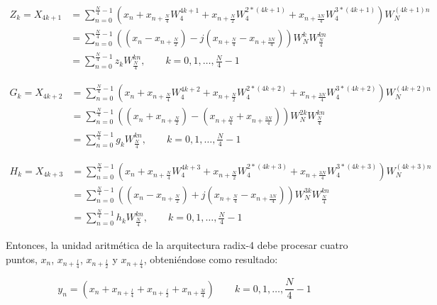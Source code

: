 \begin{equation}
\begin{split}
Z_k = X_{4k+1} &= \sum\limits_{n=0}^{\frac{N}{4}-1}(x_n + x_{n+\frac{N}{4}} W_4^{4k+1} +
x_{n+\frac{N}{2}} W_4^{2*(4k+1)} + x_{n+\frac{3N}{4}} W_4^{3*(4k+1)}) W_N^{(4k+1)n} \\
&= \sum\limits_{n=0}^{\frac{N}{4}-1}((x_n - x_{n+\frac{N}{2}}) -j (x_{n+\frac{N}{4}}
-x_{n+\frac{3N}{4}})) W_N^{k} W_{\frac{N}{4}}^{kn} \\
&= \sum\limits_{n=0}^{\frac{N}{4}-1} z_k W_{\frac{N}{4}}^{kn}, \qquad k = 0,1,\ldots,\frac{N}{4}-1
\end{split}
\label{eq:radix4_Z}
\end{equation}

\begin{equation}
\begin{split}
G_k = X_{4k+2} &= \sum\limits_{n=0}^{\frac{N}{4}-1}(x_n + x_{n+\frac{N}{4}} W_4^{4k+2} +
x_{n+\frac{N}{2}} W_4^{2*(4k+2)} + x_{n+\frac{3N}{4}} W_4^{3*(4k+2)}) W_N^{(4k+2)n} \\
&= \sum\limits_{n=0}^{\frac{N}{4}-1}((x_n + x_{n+\frac{N}{2}}) - (x_{n+\frac{N}{4}}
+ x_{n+\frac{3N}{4}})) W_N^{2k} W_{\frac{N}{4}}^{kn} \\
&= \sum\limits_{n=0}^{\frac{N}{4}-1} g_k W_{\frac{N}{4}}^{kn}, \qquad k = 0,1,\ldots,\frac{N}{4}-1
\end{split}
\label{eq:radix4_G}
\end{equation}

\begin{equation}
\begin{split}
H_k = X_{4k+3} &= \sum\limits_{n=0}^{\frac{N}{4}-1}(x_n + x_{n+\frac{N}{4}} W_4^{4k+3} +
x_{n+\frac{N}{2}} W_4^{2*(4k+3)} + x_{n+\frac{3N}{4}} W_4^{3*(4k+3)}) W_N^{(4k+3)n} \\
&= \sum\limits_{n=0}^{\frac{N}{4}-1}((x_n - x_{n+\frac{N}{2}}) +j (x_{n+\frac{N}{4}}
- x_{n+\frac{3N}{4}})) W_N^{3k} W_{\frac{N}{4}}^{kn} \\
&= \sum\limits_{n=0}^{\frac{N}{4}-1} h_k W_{\frac{N}{4}}^{kn}, \qquad k = 0,1,\ldots,\frac{N}{4}-1
\end{split}
\label{eq:radix4_H}
\end{equation}

Entonces, la unidad aritmética de la arquitectura radix-4 debe procesar cuatro puntos, $x_n$,
$x_{n+\frac{l}{4}}$, $x_{n+\frac{l}{2}}$ y $x_{n+\frac{l}{4}}$, obteniéndose como resultado:

\begin{equation}
y_n = (x_n + x_{n+\frac{l}{4}} + x_{n+\frac{l}{2}} + x_{n+\frac{3l}{4}}) \qquad k =
0,1,\ldots,\frac{N}{4}-1
\label{eq:radix4_suby}
\end{equation}

